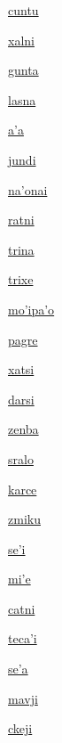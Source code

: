 {\hyperlink{val:cuntu}{cuntu}}{}{}{}

{\hyperlink{val:xalni}{xalni}}{}{}{}

{\hyperlink{val:gunta}{gunta}}{}{}{}

{\hyperlink{val:lasna}{lasna}}{}{}{}

{\hyperlink{val:aha}{a'a}}{}{}{}

{\hyperlink{val:jundi}{jundi}}{}{}{}

{\hyperlink{val:nahonai}{na'onai}}{}{}{}

{\hyperlink{val:ratni}{ratni}}{}{}{}

{\hyperlink{val:trina}{trina}}{}{}{}

{\hyperlink{val:trixe}{trixe}}{}{}{}

{\hyperlink{val:mohipaho}{mo'ipa'o}}{}{}{}

{\hyperlink{val:pagre}{pagre}}{}{}{}

{\hyperlink{val:xatsi}{xatsi}}{}{}{}

{\hyperlink{val:darsi}{darsi}}{}{}{}

{\hyperlink{val:zenba}{zenba}}{}{}{}

{\hyperlink{val:sralo}{sralo}}{}{}{}

{\hyperlink{val:karce}{karce}}{}{}{}

{\hyperlink{val:zmiku}{zmiku}}{}{}{}

{\hyperlink{val:sehi}{se'i}}{}{}{}

{\hyperlink{val:mihe}{mi'e}}{}{}{}

{\hyperlink{val:catni}{catni}}{}{}{}

{\hyperlink{val:tecahi}{teca'i}}{}{}{}

{\hyperlink{val:seha}{se'a}}{}{}{}

{\hyperlink{val:mavji}{mavji}}{}{}{}

{\hyperlink{val:ckeji}{ckeji}}{}{}{}

